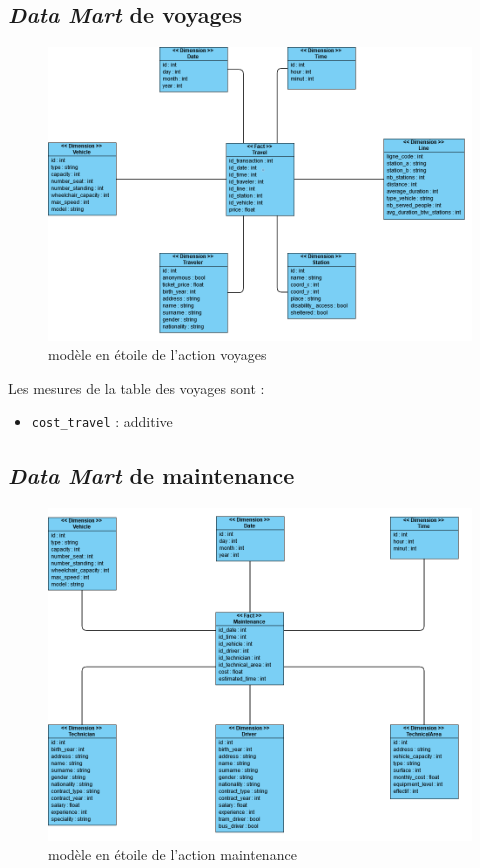 \documentclass[a4paper,12pt]{report}
\begin{document}
\subsection*{\textit{Data Mart} de \og voyages \fg}
\label{subsec:data_mart_voyages}
\begin{figure}[!ht]
  \centering
  \includegraphics[scale=0.65]{images/voyages_datamart.png}
  \caption{modèle en étoile de l'action \og voyages \fg}
\end{figure}

Les mesures de la table des voyages sont :
\begin{itemize}
  \item \texttt{cost\_travel} : additive
\end{itemize}

\newpage

\subsection*{\textit{Data Mart} de \og maintenance \fg}
\label{subsec:data_mart_maintenance}
\begin{figure}[!ht]
  \centering
  \includegraphics[scale=0.65]{images/maintenance_datamart.png}
  \caption{modèle en étoile de l'action \og maintenance \fg}
\end{figure}
\end{document}
